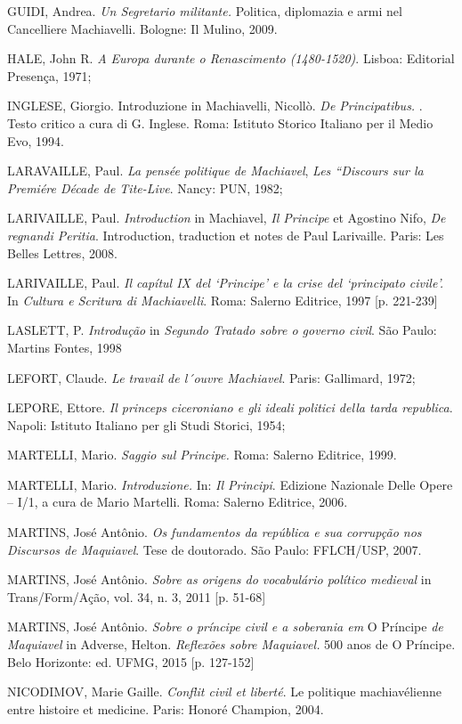 \begin{Parskip}
GUIDI, Andrea. \emph{Un Segretario militante.} Politica, diplomazia e
armi nel Cancelliere Machiavelli. Bologne: Il Mulino, 2009.

HALE, John R. \emph{A Europa durante o Renascimento (1480-1520)}.
Lisboa: Editorial Presença, 1971;

INGLESE, Giorgio. Introduzione in Machiavelli, Nicollò. \emph{De
Principatibus.} . Testo critico a cura di G. Inglese. Roma: Istituto
Storico Italiano per il Medio Evo, 1994.

LARAVAILLE, Paul. \emph{La pensée politique de Machiavel}, \emph{Les
``Discours sur la Premiére Décade de Tite-Live}. Nancy: PUN, 1982;

LARIVAILLE, Paul. \emph{Introduction} in Machiavel, \emph{Il Principe}
et Agostino Nifo, \emph{De regnandi Peritia}. Introduction, traduction
et notes de Paul Larivaille. Paris: Les Belles Lettres, 2008.

LARIVAILLE, Paul. \emph{Il capítul IX del `Principe' e la crise del
`principato civile'.} In \emph{Cultura e Scritura di Machiavelli}. Roma:
Salerno Editrice, 1997 {[}p. 221-239{]}

LASLETT, P. \emph{Introdução} in \emph{Segundo Tratado sobre o governo
civil}. São Paulo: Martins Fontes, 1998

LEFORT, Claude. \emph{Le travail de l´ouvre Machiavel}. Paris:
Gallimard, 1972;

LEPORE, Ettore. \emph{Il princeps ciceroniano e gli ideali politici
della tarda republica}. Napoli: Istituto Italiano per gli Studi Storici,
1954;

MARTELLI, Mario. \emph{Saggio sul Principe.} Roma: Salerno Editrice,
1999.

MARTELLI, Mario. \emph{Introduzione.} In: \emph{Il Principi}. Edizione
Nazionale Delle Opere -- I/1, a cura de Mario Martelli. Roma: Salerno
Editrice, 2006.

MARTINS, José Antônio. \emph{Os fundamentos da república e sua corrupção
nos Discursos de Maquiavel}. Tese de doutorado. São Paulo: FFLCH/USP,
2007.

MARTINS, José Antônio. \emph{Sobre as origens do vocabulário político
medieval} in Trans/Form/Ação, vol. 34, n. 3, 2011 {[}p. 51-68{]}

MARTINS, José Antônio. \emph{Sobre o príncipe civil e a soberania em} O
Príncipe \emph{de Maquiavel} in Adverse, Helton. \emph{Reflexões sobre
Maquiavel.} 500 anos de O Príncipe. Belo Horizonte: ed. UFMG, 2015 {[}p.
127-152{]}

NICODIMOV, Marie Gaille. \emph{Conflit civil et liberté}. Le politique
machiavélienne entre histoire et medicine. Paris: Honoré Champion, 2004.


\end{Parskip}
